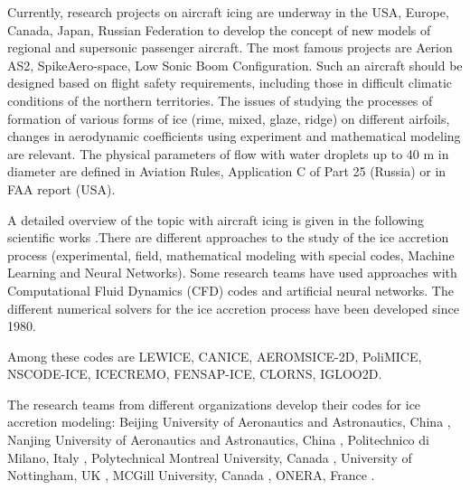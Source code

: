 \documentclass[aerospace,article,submit,moreauthors,pdftex]{Definitions/mdpi}
\begin{document}
Currently, research projects on aircraft icing are underway in the USA, Europe, Canada, Japan, Russian Federation to develop the concept of new models of regional and supersonic passenger aircraft. The most famous projects are Aerion AS2, SpikeAero-space, Low Sonic Boom Configuration. Such an aircraft should be designed based on flight safety requirements, including those in difficult climatic conditions of the northern territories. The issues of studying the processes of formation of various forms of ice (rime, mixed, glaze, ridge) on different airfoils, changes in aerodynamic coefficients using experiment and mathematical modeling are relevant. The physical parameters of flow with water droplets up to 40 {\textmu}m in diameter are defined in Aviation Rules, Application C of Part 25 \cite{AP25} (Russia) or in FAA report \cite{FAA} (USA).

A detailed overview of the topic with aircraft icing is given in the following scientific works \cite{GentDartCansdale2000,CebeciKafyeke2003,LynchKhodadoust2001,CaoTanWu2018,YamazakiJemcovSakaue2021}.There are different approaches to the study of the ice accretion process (experimental, field, mathematical modeling with special codes, Machine Learning and Neural Networks). Some research teams have used approaches with Computational Fluid Dynamics (CFD) codes and artificial neural networks. The different numerical solvers for the ice accretion process have been developed since 1980. 

Among these codes are LEWICE, CANICE, AEROMSICE-2D, PoliMICE, NSCODE-ICE, ICECREMO, FENSAP-ICE, CLORNS, IGLOO2D. 

The research teams from different organizations develop their codes for ice accretion modeling: Beijing University of Aeronautics and Astronautics, China \cite{CaoHuangYin2016}, Nanjing University of Aeronautics and Astronautics, China \cite{WangZhaoZhu2018}, Politechnico di Milano, Italy \cite{Gori2015,ArizmendiBellosta2019}, Polytechnical Montreal University, Canada \cite{PenaHoarauLaurendeau2016}, University of Nottingham, UK \cite{JanjuaTurnbullHibberdChoi2018}, MCGill University, Canada \cite{BeaugendreMorencyHabashi2005}, 
ONERA, France \cite{TrontinVilledieu2017}.
\end{document}
